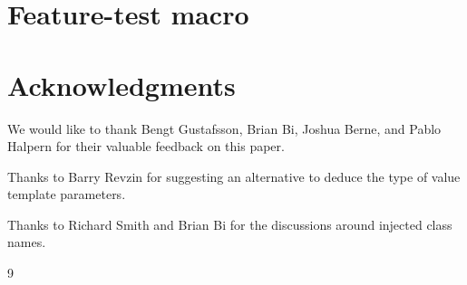 \documentclass{wg21}
\begin{document}
\section{Feature-test macro}



\section{Acknowledgments}

We would like to thank Bengt Gustafsson, Brian Bi, Joshua Berne, and Pablo Halpern for their
valuable feedback on this paper.

Thanks to Barry Revzin for suggesting an alternative to deduce the type of value template parameters.

Thanks to Richard Smith and Brian Bi for the discussions around injected class names.







\renewcommand{\section}[2]{}%

\begin{thebibliography}{9}


\end{thebibliography}
\end{document}
